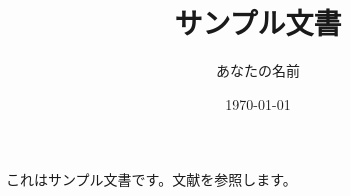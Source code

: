 \documentclass{jsarticle}
\title{サンプル文書}
\author{あなたの名前}
\date{\today}
\begin{document}
\maketitle
これはサンプル文書です。文献を参照します。
\nocite{*}
\printbibliography[title=参考文献]
\end{document}
